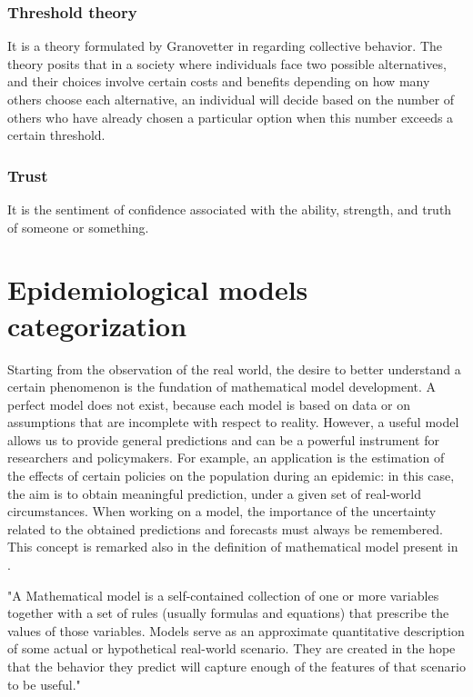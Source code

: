 \subsubsection{Threshold theory}
It is a theory formulated by Granovetter in \cite{Granovetter_1978} regarding collective behavior. The theory posits that in a society where individuals face two possible alternatives, and their choices involve certain costs and benefits depending on how many others choose each alternative, an individual will decide based on the number of others who have already chosen a particular option when this number exceeds a certain threshold.

\subsubsection{Trust} It is the sentiment of confidence associated with the ability, strength, and truth of someone or something. 

\section{Epidemiological models categorization}
\label{sec:models_categ}
Starting from the observation of the real world, the desire to better understand a certain phenomenon is the fundation of mathematical model development. A perfect model does not exist, because each model is based on data or on assumptions that are incomplete with respect to reality. However, a useful model allows us to provide general predictions and can be a powerful instrument for researchers and policymakers. For example, an application is the estimation of the effects of certain policies on the population during an epidemic: in this case, the aim is to obtain meaningful prediction, under a given set of real-world circumstances.
When working on a model, the importance of the uncertainty related to the obtained predictions and forecasts must always be remembered. This concept is remarked also in the definition of mathematical model present in \cite{Ledder_2023}. 
\begin{displayquote}
	"A Mathematical model is a self-contained collection of one or more variables together with a set of rules (usually formulas and equations) that prescribe the values of those variables. Models serve as an approximate quantitative description of some actual or hypothetical real-world scenario. They are created in the hope that the behavior they predict will capture enough of the features of that scenario to be useful."
\end{displayquote}

